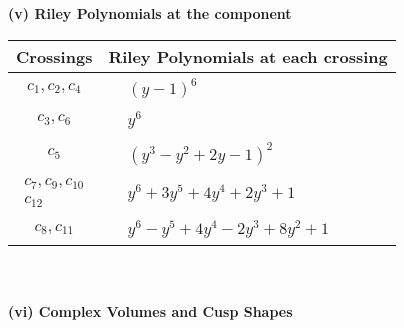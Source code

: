 \documentclass[1p]{elsarticle_modified}
\theoremstyle{definition}
\begin{document}
\newpage\renewcommand{\arraystretch}{1}
\flushleft \textbf{(v) Riley Polynomials at the component}\newline \\
\begin{tabular}{m{50pt}|m{274pt}}
Crossings & \hspace{64pt}Riley Polynomials at each crossing \\
\hline $$\begin{aligned}c_{1},c_{2},c_{4}\end{aligned}$$&$\begin{aligned}
&(y-1)^6
\end{aligned}$\\
\hline $$\begin{aligned}c_{3},c_{6}\end{aligned}$$&$\begin{aligned}
&y^6
\end{aligned}$\\
\hline $$\begin{aligned}c_{5}\end{aligned}$$&$\begin{aligned}
&(y^3- y^2+2 y-1)^2
\end{aligned}$\\
\hline $$\begin{aligned}c_{7},c_{9},c_{10}\\c_{12}\end{aligned}$$&$\begin{aligned}
&y^6+3 y^5+4 y^4+2 y^3+1
\end{aligned}$\\
\hline $$\begin{aligned}c_{8},c_{11}\end{aligned}$$&$\begin{aligned}
&y^6- y^5+4 y^4-2 y^3+8 y^2+1
\end{aligned}$\\
\hline
\end{tabular}\\~\\
\newpage\flushleft \textbf{(vi) Complex Volumes and Cusp Shapes}
\end{document}

